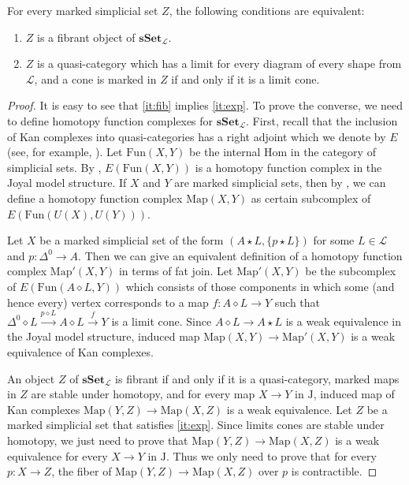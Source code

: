 \documentclass[reqno]{amsart}
\theoremstyle{definition}
\theoremstyle{remark}
\newcommand{\cat}[1]{\mathbf{#1}}
\newcommand{\sSet}{\cat{sSet}}
\newcommand{\join}{\star}
\newcommand{\fjoin}{\diamond}
\newcommand{\Map}{\mathrm{Map}}
\newcommand{\Fun}{\mathrm{Fun}}
\newcommand{\J}{\mathrm{J}}
\numberwithin{figure}{section}
\begin{document}
\begin{prop}
For every marked simplicial set $Z$, the following conditions are equivalent:
\begin{enumerate}
\item \label{it:fib} $Z$ is a fibrant object of $\sSet_\mathcal{L}$.
\item \label{it:exp} $Z$ is a quasi-category which has a limit for every diagram of every shape from $\mathcal{L}$, and a cone is marked in $Z$ if and only if it is a limit cone.
\end{enumerate}
\end{prop}
\begin{proof}
It is easy to see that \eqref{it:fib} implies \eqref{it:exp}.
To prove the converse, we need to define homotopy function complexes for $\sSet_\mathcal{L}$.
First, recall that the inclusion of Kan complexes into quasi-categories has a right adjoint which we denote by $E$ (see, for example, \cite[Proposition~1.2.5.3]{lurie-topos}).
Let $\Fun(X,Y)$ be the internal Hom in the category of simplicial sets.
By \cite[Corollary~3.1.4.4]{lurie-topos}, $E(\Fun(X,Y))$ is a homotopy function complex in the Joyal model structure.
If $X$ and $Y$ are marked simplicial sets, then by , we can define a homotopy function complex $\Map(X,Y)$ as certain subcomplex of $E(\Fun(U(X),U(Y)))$.

Let $X$ be a marked simplicial set of the form $(A \join L, \{ p \join L \})$ for some $L \in \mathcal{L}$ and $p : \Delta^0 \to A$.
Then we can give an equivalent definition of a homotopy function complex $\Map'(X,Y)$ in terms of fat join.
Let $\Map'(X,Y)$ be the subcomplex of $E(\Fun(A \fjoin L, Y))$ which consists of those components in which some (and hence every) vertex
corresponds to a map $f : A \fjoin L \to Y$ such that $\Delta^0 \fjoin L \xrightarrow{p \fjoin L} A \fjoin L \xrightarrow{f} Y$ is a limit cone.
Since $A \fjoin L \to A \join L$ is a weak equivalence in the Joyal model structure, induced map $\Map(X,Y) \to \Map'(X,Y)$ is a weak equivalence of Kan complexes.

An object $Z$ of $\sSet_\mathcal{L}$ is fibrant if and only if it is a quasi-category, marked maps in $Z$ are stable under homotopy,
and for every map $X \to Y$ in $\J$, induced map of Kan complexes $\Map(Y,Z) \to \Map(X,Z)$ is a weak equivalence.
Let $Z$ be a marked simplicial set that satisfies \eqref{it:exp}.
Since limits cones are stable under homotopy, we just need to prove that $\Map(Y,Z) \to \Map(X,Z)$ is a weak equivalence for every $X \to Y$ in $\J$.
Thus we only need to prove that for every $p : X \to Z$, the fiber of $\Map(Y,Z) \to \Map(X,Z)$ over $p$ is contractible.


\end{proof}
\end{document}
